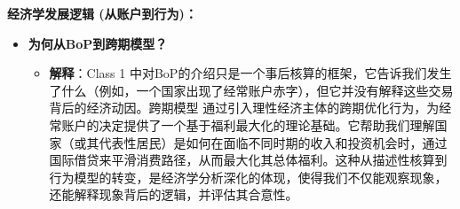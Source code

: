 \documentclass[12pt]{article}
\begin{document}
\textbf{经济学发展逻辑 (从账户到行为)：}
\begin{itemize}
    \item \textbf{为何从BoP到跨期模型？}
    \begin{itemize}
        \item \textbf{解释}：Class 1  中对BoP的介绍只是一个事后核算的框架，它告诉我们发生了什么（例如，一个国家出现了经常账户赤字），但它并没有解释这些交易背后的经济动因。跨期模型  通过引入理性经济主体的跨期优化行为，为经常账户的决定提供了一个基于福利最大化的理论基础。它帮助我们理解国家（或其代表性居民）是如何在面临不同时期的收入和投资机会时，通过国际借贷来平滑消费路径，从而最大化其总体福利。这种从描述性核算到行为模型的转变，是经济学分析深化的体现，使得我们不仅能观察现象，还能解释现象背后的逻辑，并评估其合意性。
    \end{itemize}
\end{itemize}
\end{document}
